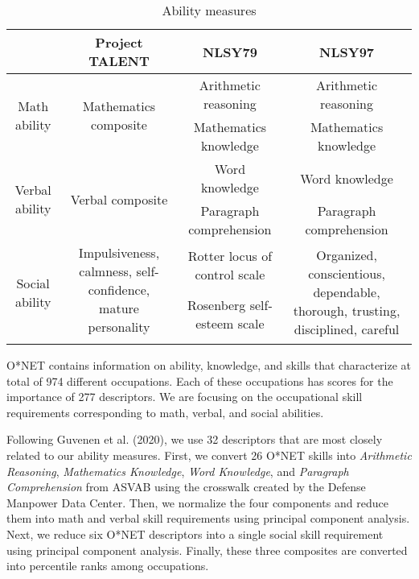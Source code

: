 \documentclass[onehalfspacing,11pt]{article}
\begin{document}
\begin{table}[ht!]
	\begin{center}
{\footnotesize	\begin{tabular}{|| c | c | c | c |} 
			\hline
			 & Project TALENT & NLSY79 & NLSY97\\ [0.5ex] 
			\hline\hline
			\multirow{2}{2cm}{\centering Math ability} & \multirow{2}{3.7cm}{\centering Mathematics composite} & Arithmetic reasoning & Arithmetic reasoning \\ 
			 & & Mathematics knowledge & Mathematics knowledge \\ 
			 \hline
			\multirow{2}{2cm}{\centering Verbal ability} & \multirow{2}{3.7cm}{\centering Verbal composite} & Word knowledge & Word knowledge \\ 
			 &  & Paragraph comprehension & Paragraph comprehension \\ 
			 \hline
			\multirow{3}{2cm}{\centering Social ability} & \multirow{2}{3.7cm}{\centering Impulsiveness, calmness, self-confidence, mature personality} & Rotter locus of control scale & \multirow{3}{4.5cm}{\centering Organized, conscientious, dependable, thorough, trusting, disciplined, careful} \\ 
			 & & Rosenberg self-esteem scale &   \\
			 &  &  &  \\
			\hline
		\end{tabular}}
		    \caption{Ability measures}\label{tab:ability}
	\end{center}
\end{table}

O*NET contains information on ability, knowledge, and skills that characterize at total of 974 different occupations. Each of these occupations has scores for the importance of 277 descriptors. We are focusing on the occupational skill requirements corresponding to math, verbal, and social abilities.

Following Guvenen et al. (2020), we use 32 descriptors that are most closely related to our ability measures. First, we convert 26 O*NET skills into {\it Arithmetic Reasoning}, {\it Mathematics Knowledge}, {\it Word Knowledge}, and {\it Paragraph Comprehension} from ASVAB using the crosswalk created by the Defense Manpower Data Center. Then, we normalize the four components and reduce them into math and verbal skill requirements using principal component analysis. Next, we reduce six O*NET descriptors into a single social skill requirement using principal component analysis. Finally, these three composites are converted into percentile ranks among occupations.
\end{document}

